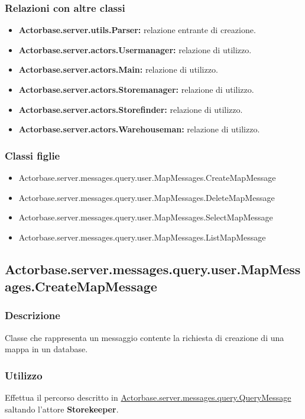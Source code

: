 \documentclass[a4paper]{article}
\begin{document}
			\subsubsection{Relazioni con altre classi}
				\begin{itemize}
					\item \textbf{Actorbase.server.utils.Parser:} relazione entrante di creazione.
					\item \textbf{Actorbase.server.actors.Usermanager:} relazione di utilizzo.
					\item \textbf{Actorbase.server.actors.Main:} relazione di utilizzo.
					\item \textbf{Actorbase.server.actors.Storemanager:} relazione di utilizzo.
					\item \textbf{Actorbase.server.actors.Storefinder:} relazione di utilizzo.
					\item \textbf{Actorbase.server.actors.Warehouseman:} relazione di utilizzo.
				\end{itemize}
				
			\subsubsection{Classi figlie}
				\begin{itemize}
					\item Actorbase.server.messages.query.user.MapMessages.CreateMapMessage
					\item Actorbase.server.messages.query.user.MapMessages.DeleteMapMessage
					\item Actorbase.server.messages.query.user.MapMessages.SelectMapMessage
					\item Actorbase.server.messages.query.user.MapMessages.ListMapMessage
				\end{itemize}
				
		\subsection{Actorbase.server.messages.query.user.MapMessages.CreateMapMessage}
			\subsubsection{Descrizione}
				Classe che rappresenta un messaggio contente la richiesta di creazione di una mappa in un database.
				
			\subsubsection{Utilizzo}
				Effettua il percorso descritto in \hyperref[QueryMessage]{Actorbase.server.messages.query.QueryMessage} saltando l'attore \textbf{Storekeeper}.
				
\end{document}
